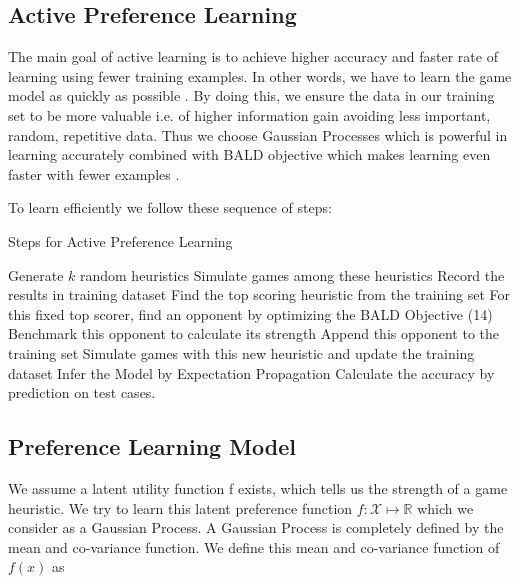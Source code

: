 \documentclass{scrartcl}
\begin{document}
\subsection {Active Preference Learning}
The main goal of active learning is to achieve higher accuracy and faster rate of learning using fewer training examples. In other words, we have to learn the game model as quickly as possible \cite{eric2008active}. By doing this, we ensure the data in our training set to be more valuable i.e. of higher information gain avoiding less important, random, repetitive data. Thus we choose Gaussian Processes which is powerful in learning accurately combined with BALD objective which makes learning even faster with fewer examples \cite{houlsby2012collaborative}.


\newpage
To learn efficiently we follow these sequence of steps:

\begin{algorithm}
\caption{Steps for Active Preference Learning}
\begin{algorithmic}
\State Generate $k$ random heuristics 
\State Simulate games among these heuristics
\State Record the results in training dataset
\State Find the top scoring heuristic from the training set
\State For this fixed top scorer, find an opponent by optimizing the BALD Objective (14)
\State Benchmark this opponent to calculate its strength
\State Append this opponent to the training set
\State Simulate games with this new heuristic and update the training dataset
\State Infer the Model by Expectation Propagation
\State Calculate the accuracy by prediction on test cases.

\EndFor	
\end{algorithmic}

\end{algorithm}




		
\subsection{Preference Learning Model}

	We assume a latent utility function f exists, which tells us the strength of a game heuristic. We try to learn this latent preference function $f:\mathcal{X}\mapsto \mathbb{R}$ which we consider as a Gaussian Process. A Gaussian Process is completely defined by the mean and co-variance function. We define this mean and co-variance function of $f(x)$ as 
\end{document}
